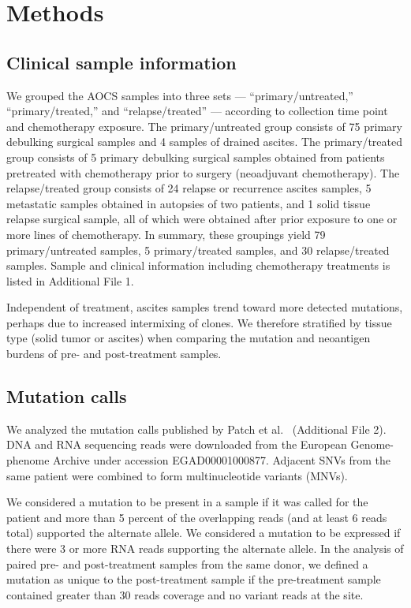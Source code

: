 \section*{Methods}

\subsection*{Clinical sample information}
We grouped the AOCS samples into three sets --- ``primary/untreated,'' ``primary/treated,'' and ``relapse/treated'' --- according to collection time point and chemotherapy exposure. The primary/untreated group consists of 75 primary debulking surgical samples and 4 samples of drained ascites. The primary/treated group consists of 5 primary debulking surgical samples obtained from patients pretreated with chemotherapy prior to surgery (neoadjuvant chemotherapy). The relapse/treated group consists of 24 relapse or recurrence ascites samples, 5 metastatic samples obtained in autopsies of two patients, and 1 solid tissue relapse surgical sample, all of which were obtained after prior exposure to one or more lines of chemotherapy.  In summary, these groupings yield 79 primary/untreated samples, 5 primary/treated samples, and 30 relapse/treated samples. Sample and clinical information including chemotherapy treatments is listed in Additional File 1.

Independent of treatment, ascites samples trend toward more detected mutations, perhaps due to increased intermixing of clones. We therefore stratified by tissue type (solid tumor or ascites) when comparing the mutation and neoantigen burdens of pre- and post-treatment samples.

\subsection*{Mutation calls}
We analyzed the mutation calls published by Patch et al.~\cite{Patch_2015} (Additional File 2). DNA and RNA sequencing reads were downloaded from the European Genome-phenome Archive under accession EGAD00001000877. Adjacent SNVs from the same patient were combined to form multinucleotide variants (MNVs). 

We considered a mutation to be present in a sample if it was called for the patient and more than 5 percent of the overlapping reads (and at least 6 reads total) supported the alternate allele. We considered a mutation to be expressed if there were 3 or more RNA reads supporting the alternate allele. In the analysis of paired pre- and post-treatment samples from the same donor, we defined a mutation as unique to the post-treatment sample if the pre-treatment sample contained greater than 30 reads coverage and no variant reads at the site.

